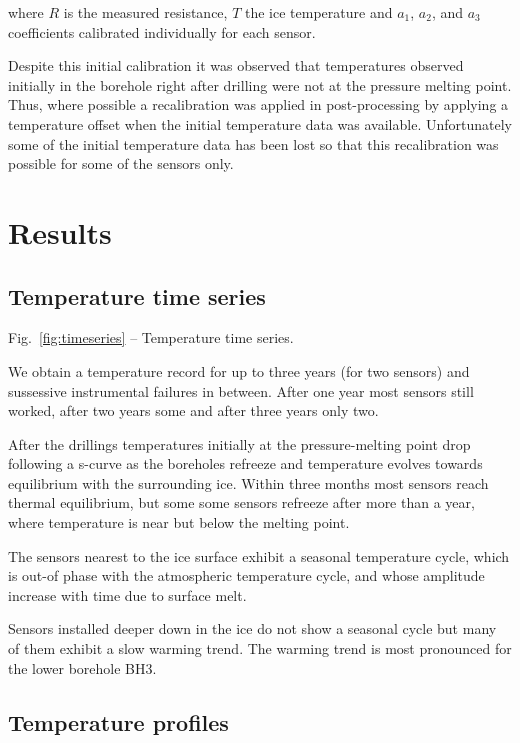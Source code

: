 \documentclass[utf8]{article}
\begin{document}
    where $R$ is the measured resistance, $T$ the ice temperature and $a_1$,
    $a_2$, and $a_3$ coefficients calibrated individually for each sensor.

    Despite this initial calibration it was observed that temperatures
    observed initially in the borehole right after drilling were not at the
    pressure melting point. Thus, where possible a recalibration was applied in
    post-processing by applying a temperature offset when the initial
    temperature data was available. Unfortunately some of the initial
    temperature data has been lost so that this recalibration was possible for
    some of the sensors only.


\section{Results}

\subsection{Temperature time series}

    Fig.~\ref{fig:timeseries} -- Temperature time series.

    We obtain a temperature record for up to three years (for two sensors) and
    sussessive instrumental failures in between. After one year most sensors
    still worked, after two years some and after three years only two.

    After the drillings temperatures initially at the pressure-melting point
    drop following a s-curve as the boreholes refreeze and temperature evolves
    towards equilibrium with the surrounding ice. Within three months most
    sensors reach thermal equilibrium, but some some sensors refreeze after
    more than a year, where temperature is near but below the melting point.

    The sensors nearest to the ice surface exhibit a seasonal temperature
    cycle, which is out-of phase with the atmospheric temperature cycle, and
    whose amplitude increase with time due to surface melt.

    Sensors installed deeper down in the ice do not show a seasonal cycle but
    many of them exhibit a slow warming trend. The warming trend is most
    pronounced for the lower borehole BH3.


\subsection{Temperature profiles}
\end{document}
